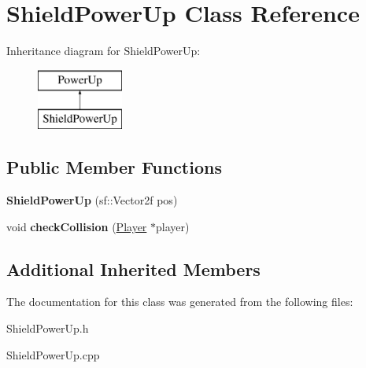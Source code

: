 \hypertarget{class_shield_power_up}{}\section{Shield\+Power\+Up Class Reference}
\label{class_shield_power_up}
Inheritance diagram for Shield\+Power\+Up\+:\begin{figure}[H]
\begin{center}
\leavevmode
\includegraphics[height=2.000000cm]{class_shield_power_up}
\end{center}
\end{figure}
\subsection*{Public Member Functions}
\begin{DoxyCompactItemize}
\item 
\mbox{\label{class_shield_power_up_ac41f988ed81ed73f22cf83fbf1481964}} 
{\bfseries Shield\+Power\+Up} (sf\+::\+Vector2f pos)
\item 
\mbox{\label{class_shield_power_up_a4055c8c6d5412da1c338baca3658a301}} 
void {\bfseries check\+Collision} (\mbox{\hyperlink{class_player}{Player}} $\ast$player)
\end{DoxyCompactItemize}
\subsection*{Additional Inherited Members}


The documentation for this class was generated from the following files\+:\begin{DoxyCompactItemize}
\item 
Shield\+Power\+Up.\+h\item 
Shield\+Power\+Up.\+cpp\end{DoxyCompactItemize}
